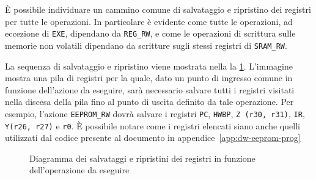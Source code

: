 È possibile individuare un cammino comune di salvataggio e ripristino dei registri per tutte le operazioni. In particolare è evidente come tutte le operazioni, ad eccezione di \texttt{EXE}, dipendano da \texttt{REG\_RW}, e come le operazioni di scrittura sulle memorie non volatili dipendano da scritture sugli stessi registri di \texttt{SRAM\_RW}.

La sequenza di salvataggio e ripristino viene mostrata nella la \cref{fig:dw-wrt-seq}. L'immagine mostra una pila di registri per la quale, dato un punto di ingresso comune in funzione dell'azione da eseguire, sarà necessario salvare tutti i registri visitati nella discesa della pila fino al punto di uscita definito da tale operazione. Per esempio, l'azione \texttt{EEPROM\_RW} dovrà salvare i registri \texttt{PC}, \texttt{HWBP}, \texttt{Z (r30, r31)}, \texttt{IR}, \texttt{Y(r26, r27)} e \texttt{r0}. È possibile notare come i registri elencati siano anche quelli utilizzati dal codice presente al documento in appendice~\ref{app:dw-eeprom-prog}

\begin{figure}[h]
    \centering

    \caption[]{Diagramma dei salvataggi e ripristini dei registri in funzione dell'operazione da eseguire}\label{fig:dw-wrt-seq}
\end{figure}

